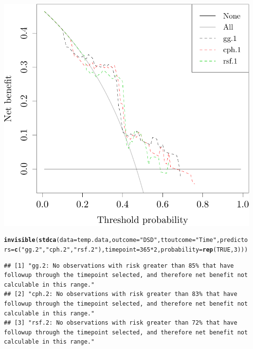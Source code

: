 \documentclass{article}\usepackage[]{graphicx}\usepackage[]{color}
\makeatletter
\def\maxwidth{ %
  \ifdim\Gin@nat@width>\linewidth
    \linewidth
  \else
    \Gin@nat@width
  \fi
}
\newcommand{\hlnum}[1]{\textcolor[rgb]{0.686,0.059,0.569}{#1}}%
\newcommand{\hlstr}[1]{\textcolor[rgb]{0.192,0.494,0.8}{#1}}%
\newcommand{\hlopt}[1]{\textcolor[rgb]{0,0,0}{#1}}%
\newcommand{\hlstd}[1]{\textcolor[rgb]{0.345,0.345,0.345}{#1}}%
\newcommand{\hlkwc}[1]{\textcolor[rgb]{0.333,0.667,0.333}{#1}}%
\newcommand{\hlkwd}[1]{\textcolor[rgb]{0.737,0.353,0.396}{\textbf{#1}}}%
\newenvironment{kframe}{%
 \def\at@end@of@kframe{}%
 \ifinner\ifhmode%
  \def\at@end@of@kframe{\end{minipage}}%
  \begin{minipage}{\columnwidth}%
 \fi\fi%
 \def\FrameCommand##1{\hskip\@totalleftmargin \hskip-\fboxsep
 \colorbox{shadecolor}{##1}\hskip-\fboxsep
     \hskip-\linewidth \hskip-\@totalleftmargin \hskip\columnwidth}%
 \MakeFramed {\advance\hsize-\width
   \@totalleftmargin\z@ \linewidth\hsize
   \@setminipage}}%
 {\par\unskip\endMakeFramed%
 \at@end@of@kframe}
\newenvironment{knitrout}{}{} %
\makeatother
\begin{document}
\begin{knitrout}
{\centering \includegraphics[width=\maxwidth]{figure/05-model-selection-dca-1} 

}


\begin{kframe}\begin{alltt}
\hlkwd{invisible}\hlstd{(}\hlkwd{stdca}\hlstd{(}\hlkwc{data} \hlstd{= temp.data,} \hlkwc{outcome} \hlstd{=} \hlstr{"DSD"}\hlstd{,} \hlkwc{ttoutcome} \hlstd{=} \hlstr{"Time"}\hlstd{,} \hlkwc{predictors} \hlstd{=} \hlkwd{c}\hlstd{(}\hlstr{"gg.2"}\hlstd{,} \hlstr{"cph.2"}\hlstd{,} \hlstr{"rsf.2"}\hlstd{),} \hlkwc{timepoint} \hlstd{=} \hlnum{365}\hlopt{*}\hlnum{2}\hlstd{,} \hlkwc{probability} \hlstd{=} \hlkwd{rep}\hlstd{(}\hlnum{TRUE}\hlstd{,} \hlnum{3}\hlstd{)))}
\end{alltt}
\begin{verbatim}
## [1] "gg.2: No observations with risk greater than 85% that have followup through the timepoint selected, and therefore net benefit not calculable in this range." 
## [2] "cph.2: No observations with risk greater than 83% that have followup through the timepoint selected, and therefore net benefit not calculable in this range."
## [3] "rsf.2: No observations with risk greater than 72% that have followup through the timepoint selected, and therefore net benefit not calculable in this range."
\end{verbatim}
\end{kframe}


\end{knitrout}
\end{document}
